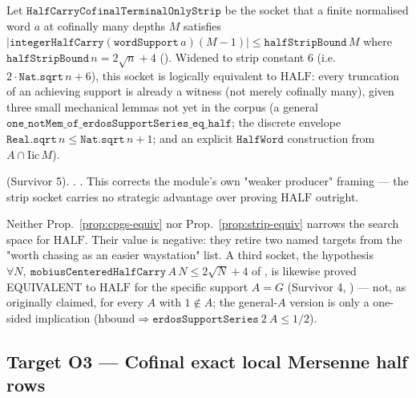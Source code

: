 \begin{prop}
\label{prop:strip-equiv}
Let $\mathtt{HalfCarryCofinalTerminalOnlyStrip}$ be the socket that a finite normalised word $a$
at cofinally many depths $M$ satisfies $|\mathtt{integerHalfCarry}(\mathtt{wordSupport}\,a)(M-1)|
\le \mathtt{halfStripBound}\,M$ where $\mathtt{halfStripBound}\,n = 2\sqrt{n}+4$
(). Widened to strip
constant $6$ (i.e. $2\cdot\mathtt{Nat.sqrt}\,n+6$), this socket is logically equivalent to
$\mathrm{HALF}$: every truncation of an achieving support is already a witness (not merely
cofinally many), given three small mechanical lemmas not yet in the corpus (a general
$\mathtt{one\_notMem\_of\_erdosSupportSeries\_eq\_half}$; the discrete envelope
$\mathtt{Real.sqrt}\,n\le\mathtt{Nat.sqrt}\,n+1$; and an explicit $\mathtt{HalfWord}$
construction from $A\cap\mathrm{Iic}\,M$).
\end{prop}
 (Survivor 5). . . This corrects the module's own "weaker producer" framing --- the strip
socket carries no strategic advantage over proving $\mathrm{HALF}$ outright.

\begin{obs}
Neither Prop.~\ref{prop:cpgs-equiv} nor Prop.~\ref{prop:strip-equiv} narrows the search space for
$\mathrm{HALF}$. Their value is negative: they retire two named targets from the "worth chasing as
an easier waystation" list. A third socket, the hypothesis $\forall N,\ \mathtt{mobiusCenteredHalfCarry}\,A\,N\le 2\sqrt N+4$
of ,
is likewise proved EQUIVALENT to $\mathrm{HALF}$ for the specific support $A=G$ (Survivor 4,
) --- not, as originally claimed, for every $A$ with
$1\notin A$; the general-$A$ version is only a one-sided implication ($\mathrm{hbound}\Rightarrow
\mathtt{erdosSupportSeries}\ 2\ A\le 1/2$).
\end{obs}

\subsection{Target O3 --- Cofinal exact local Mersenne half rows}

